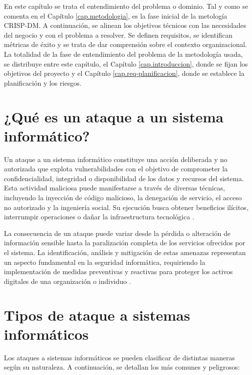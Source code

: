 En este capítulo se trata el entendimiento del problema o dominio. Tal y como se comenta en el Capítulo \ref{cap.metodologia}, es la fase inicial de la metología CRISP-DM. A continuación, se alinean los objetivos técnicos con las necesidades del negocio y con el problema a resolver. Se definen requisitos, se identifican métricas de éxito y se trata de dar comprensión sobre el contexto organizacional. La totalidad de la fase de entendimiento del problema de la metodología usada, se distribuye entre este capítulo, el Capítulo \ref{cap.introduccion}, donde se fijan los objetivos del proyecto y el Capítulo \ref{cap.req-planificacion}, donde se establece la planificación y los riesgos.


\section{¿Qué es un ataque a un sistema informático?}
Un ataque a un sistema informático constituye una acción deliberada y no autorizada que explota vulnerabilidades con el objetivo de comprometer la confidencialidad, integridad o disponibilidad de los datos y recursos del sistema. Esta actividad maliciosa puede manifestarse a través de diversas técnicas, incluyendo la inyección de código malicioso, la denegación de servicio, el acceso no autorizado y la ingeniería social. Su ejecución busca obtener beneficios ilícitos, interrumpir operaciones o dañar la infraestructura tecnológica \cite{ethical_hacking}.

La consecuencia de un ataque puede variar desde la pérdida o alteración de información sensible hasta la paralización completa de los servicios ofrecidos por el sistema. La identificación, análisis y mitigación de estas amenazas representan un aspecto fundamental en la seguridad informática, requiriendo la implementación de medidas preventivas y reactivas para proteger los activos digitales de una organización o individuo \cite{conataques}.

\section{Tipos de ataque a sistemas informáticos}
Los ataques a sistemas informáticos se pueden clasificar de distintas maneras según su naturaleza. A continuación, se detallan los más comunes y peligrosos:

